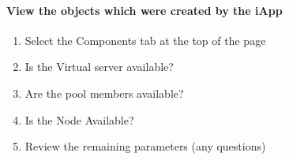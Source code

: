 \documentclass[letterpaper,10pt,english]{sphinxmanual}
\begin{document}
\paragraph{View the objects which were created by the iApp}
\label{\detokenize{class2/module1/lab1:id7}}\begin{enumerate}
\item {} 
Select the Components tab at the top of the page

\item {} 
Is the Virtual server available?

\item {} 
Are the pool members available?

\item {} 
Is the Node Available?

\item {} 
Review the remaining parameters (any questions)

\end{enumerate}
\end{document}
